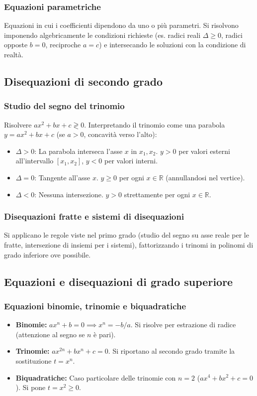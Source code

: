 \subsubsection{Equazioni parametriche}
Equazioni in cui i coefficienti dipendono da uno o più parametri. Si risolvono imponendo algebricamente le condizioni richieste (es. radici reali $\Delta \ge 0$, radici opposte $b=0$, reciproche $a=c$) e intersecando le soluzioni con la condizione di realtà.

\subsection{Disequazioni di secondo grado}
\subsubsection{Studio del segno del trinomio}
Risolvere $ax^2+bx+c \gtrless 0$. Interpretando il trinomio come una parabola $y = ax^2+bx+c$ (se $a>0$, concavità verso l'alto):
\begin{itemize}
    \item $\Delta > 0$: La parabola interseca l'asse $x$ in $x_1, x_2$. $y > 0$ per valori esterni all'intervallo $[x_1, x_2]$, $y < 0$ per valori interni.
    \item $\Delta = 0$: Tangente all'asse $x$. $y \ge 0$ per ogni $x \in \mathbb{R}$ (annullandosi nel vertice).
    \item $\Delta < 0$: Nessuna intersezione. $y > 0$ strettamente per ogni $x \in \mathbb{R}$.
\end{itemize}

\subsubsection{Disequazioni fratte e sistemi di disequazioni}
Si applicano le regole viste nel primo grado (studio del segno su asse reale per le fratte, intersezione di insiemi per i sistemi), fattorizzando i trinomi in polinomi di grado inferiore ove possibile.

\subsection{Equazioni e disequazioni di grado superiore}
\subsubsection{Equazioni binomie, trinomie e biquadratiche}
\begin{itemize}
    \item \textbf{Binomie:} $ax^n + b = 0 \implies x^n = -b/a$. Si risolve per estrazione di radice (attenzione al segno se $n$ è pari).
    \item \textbf{Trinomie:} $ax^{2n} + bx^n + c = 0$. Si riportano al secondo grado tramite la sostituzione $t = x^n$.
    \item \textbf{Biquadratiche:} Caso particolare delle trinomie con $n=2$ ($ax^4+bx^2+c=0$). Si pone $t=x^2 \ge 0$.
\end{itemize}

